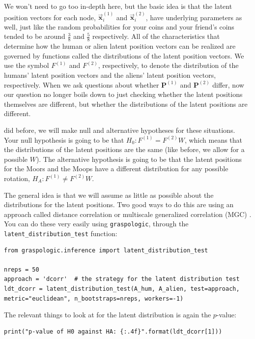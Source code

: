 We won't need to go too in-depth here, but the basic idea is that the latent position vectors for each node, $\mathbf{\vec x}_i^{(1)}$ and $\mathbf{\vec x}_i^{(2)}$, have underlying parameters as well, just like the random probabilities for your coins and your friend's coins tended to be around $\frac{3}{8}$ and $\frac{5}{8}$ respectively. All of the characteristics that determine how the human or alien latent position vectors can be realized are governed by functions called the distributions of the latent position vectors. We use the symbol $F^{(1)}$ and $F^{(2)}$, respectively, to denote the distribution of the humans' latent position vectors and the aliens' latent position vectors, respectively. When we ask questions about whether $\mathbf P^{(1)}$ and $\mathbf P^{(2)}$ differ, now our question no longer boils down to just checking whether the latent positions themselves are different, but whether the distributions of the latent positions are different.

did before, we will make null and alternative hypotheses for these situations. Your null hypothesis is going to be that $H_0 : F^{(1)} = F^{(2)}W$, which means that the distributions of the latent positions are the same (like before, we allow for a possible $W$). The alternative hypothesis is going to be that the latent positions for the Moors and the Moops have a different distribution for any possible rotation, $H_A : F^{(1)} \neq F^{(2)}W$.

The general idea is that we will assume as little as possible about the distributions for the latent positions. Two good ways to do this are using an approach called distance correlation \cite{Szekely2007Dec} or multiscale generalized correlation (MGC) \cite{Vogelstein2019Jan}. You can do these very easily using \texttt{graspologic}, through the \texttt{latent\_distribution\_test} function:

\begin{lstlisting}[style=python]
from graspologic.inference import latent_distribution_test

nreps = 50
approach = 'dcorr'  # the strategy for the latent distribution test
ldt_dcorr = latent_distribution_test(A_hum, A_alien, test=approach, metric="euclidean", n_bootstraps=nreps, workers=-1)
\end{lstlisting}

The relevant things to look at for the latent distribution is again the $p$-value:

\begin{lstlisting}[style=python]
print("p-value of H0 against HA: {:.4f}".format(ldt_dcorr[1]))
\end{lstlisting}

